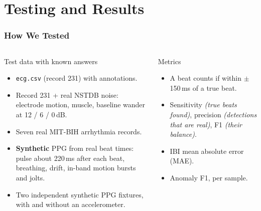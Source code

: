 \documentclass[t,aspectratio=169]{beamer}
\newcommand{\code}[1]{\texttt{#1}}
\newcommand{\plain}[1]{{\color{gray}\textit{(#1)}}}
\begin{document}
\section{Testing and Results}
\begin{frame}
\frametitle{How We Tested}
\begin{columns}[T]
\begin{block}{Test data with known answers}
\small
\begin{itemize}
  \item \code{ecg.csv} (record 231) with annotations.
  \item Record 231 + real NSTDB noise: electrode motion, muscle, baseline wander at 12 / 6 / 0\,dB.
  \item Seven real MIT-BIH arrhythmia records.
  \item \textbf{Synthetic} PPG from real beat times: pulse about 220\,ms after each beat, breathing, drift,
        in-band motion bursts and jolts.
  \item Two independent synthetic PPG fixtures, with and without an accelerometer.
\end{itemize}
\end{block}
\begin{exampleblock}{Metrics}
\small
\begin{itemize}
  \item A beat counts if within $\pm$150\,ms of a true beat.
  \item Sensitivity \plain{true beats found}, precision \plain{detections that are real}, F1 \plain{their balance}.
  \item IBI mean absolute error (MAE).
  \item Anomaly F1, per sample.
\end{itemize}
\end{exampleblock}
\end{columns}
\end{frame}
\end{document}
